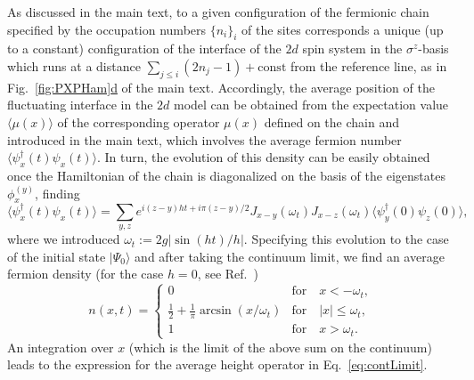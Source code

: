 \documentclass[reprint,aps,prl,superscriptaddress,english,nolongbibliography]{revtex4-2}
\begin{document}
As discussed in the main text, to a given configuration of the fermionic chain specified by the occupation numbers $\{ n_i \}_i$  of the sites corresponds a unique (up to a constant) configuration of the interface of the $2d$ spin system in the $\sigma^z$-basis which runs at a distance $\sum_{j\le i} (2 n_j - 1) + \mbox{const}$  from the reference line, as in Fig.~\hyperref[fig:PXPHam]{\ref{fig:PXPHam}d} of the main text. Accordingly, the average position of the fluctuating interface in the $2d$ model can be obtained from the expectation value $\langle \mu(x) \rangle$ of the corresponding operator $\mu(x)$ defined on the chain and introduced in the main text, which involves the average fermion number $\langle \psi^\dagger_x(t)\psi_x(t)\rangle$. In turn, the evolution of this density can be easily obtained once the Hamiltonian of the chain is diagonalized on the basis of the eigenstates $\phi_x^{(y)}$, finding 
\begin{equation}
    \langle \psi^\dagger_x(t)\psi_x(t)\rangle = \sum_{y,z} e^{i(z-y)ht + i \pi(z-y)/2} J_{x-y}(\omega_t) J_{x-z}(\omega_t) \langle \psi^\dagger_y(0)\psi_z(0)\rangle,
\end{equation}
where we introduced $\omega_t := 2 g |\sin(ht)/h|$. Specifying this evolution to the case of the initial state $|\Psi_0\rangle$ and after taking the continuum limit, we find an average fermion density (for the case $h=0$, see Ref.~\cite{Antal1999Transport})
\begin{equation}
    n(x,t) =
    \begin{cases}
        0       &\mbox{for}\quad  x < - \omega_t,\\
        \frac{1}{2} + \frac{1}{\pi}\arcsin(x/\omega_t)
        &\mbox{for}\quad |x| \leq \omega_t, \\
        1       &\mbox{for}\quad x > \omega_t.
    \end{cases}
\end{equation}
An integration over $x$ (which is the limit of the above sum on the continuum) leads to the expression for the average height operator in Eq.~\eqref{eq:contLimit}.



\end{document}
